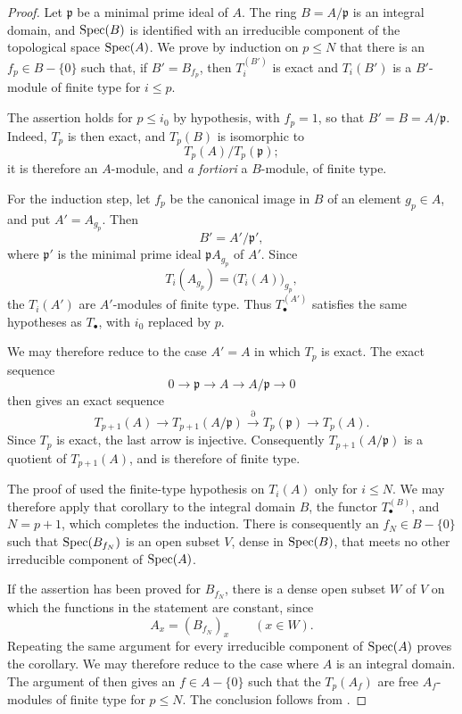 \begin{proof}
Let $\mathfrak p$ be a minimal prime ideal of $A$.  The ring
$B=A/\mathfrak p$ is an integral domain, and $\operatorname{Spec}(B)$ is
identified with an irreducible component of the topological
space $\operatorname{Spec}(A)$.  We prove by induction on $p\leq N$ that
there is an $f_p\in B-\{0\}$ such that, if
$B'=B_{f_p}$, then $T_i^{(B')}$ is exact and $T_i(B')$ is a
$B'$-module of finite type for $i\leq p$.

The assertion holds for $p\leq i_0$ by hypothesis, with
$f_p=1$, so that $B'=B=A/\mathfrak p$.  Indeed, $T_p$ is then
exact, and $T_p(B)$ is isomorphic to
\[
  T_p(A)/T_p(\mathfrak p);
\]
it is therefore an $A$-module, and \emph{a fortiori} a
$B$-module, of finite type.

For the induction step, let $f_p$ be the canonical image in
$B$ of an element $g_p\in A$, and put $A'=A_{g_p}$.  Then
\[
  B'=A'/\mathfrak p',
\]
where $\mathfrak p'$ is the minimal prime ideal
$\mathfrak pA_{g_p}$ of $A'$.  Since
\[
  T_i(A_{g_p})=\bigl(T_i(A)\bigr)_{g_p},
\]
the $T_i(A')$ are $A'$-modules of finite type.  Thus
$T_\bullet^{(A')}$ satisfies the same hypotheses as
$T_\bullet$, with $i_0$ replaced by $p$.

We may therefore reduce to the case $A'=A$ in which $T_p$ is
exact.  The exact sequence
\[
  0\longrightarrow\mathfrak p
  \longrightarrow A
  \longrightarrow A/\mathfrak p
  \longrightarrow0
\]
then gives an exact sequence
\[
  T_{p+1}(A)
  \longrightarrow
  T_{p+1}(A/\mathfrak p)
  \xrightarrow{\partial}
  T_p(\mathfrak p)
  \longrightarrow
  T_p(A).
\]
Since $T_p$ is exact, the last arrow is injective.
Consequently $T_{p+1}(A/\mathfrak p)$ is a quotient of
$T_{p+1}(A)$, and is therefore of finite type.

The proof of  used the finite-type hypothesis
on $T_i(A)$ only for $i\leq N$.  We may therefore apply that
corollary to the integral domain $B$, the functor
$T_\bullet^{(B)}$, and $N=p+1$, which completes the induction.
There is consequently an $f_N\in B-\{0\}$ such that
$\operatorname{Spec}(B_{f_N})$ is an open subset $V$, dense in $\operatorname{Spec}(B)$,
that meets no other irreducible component of $\operatorname{Spec}(A)$.


If the assertion has been proved for $B_{f_N}$, there is a
dense open subset $W$ of $V$ on which the functions in the
statement are constant, since
\[
  A_x=(B_{f_N})_x
  \qquad(x\in W).
\]
Repeating the same argument for every irreducible component of
$\operatorname{Spec}(A)$ proves the corollary.  We may therefore reduce to
the case where $A$ is an integral domain.  The argument of
 then gives an $f\in A-\{0\}$ such that the
$T_p(A_f)$ are free $A_f$-modules of finite type for
$p\leq N$.  The conclusion follows from .
\end{proof}

